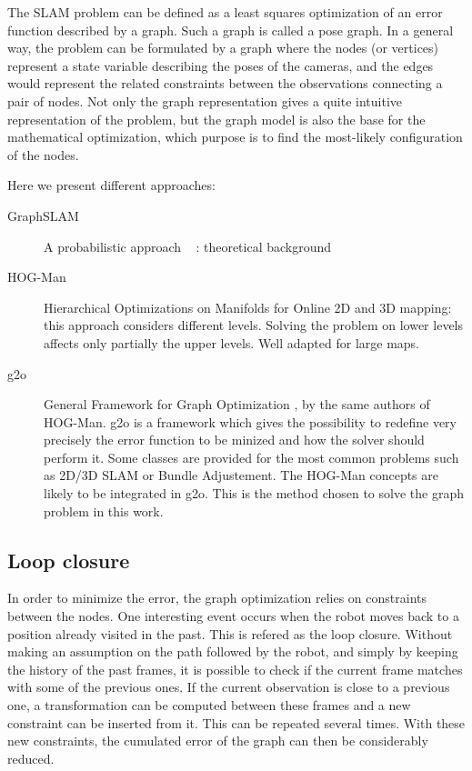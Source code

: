 The SLAM problem can be defined as a least squares optimization of an error function described by a graph. Such a graph is called a pose graph. In a general way, the problem can be formulated by a graph where the nodes (or vertices) represent a state variable describing the poses of the cameras, and the edges would represent the related constraints between the observations connecting a pair of nodes. Not only the graph representation gives a quite intuitive representation of the problem, but the graph model is also the base for the mathematical optimization, which purpose is to find the most-likely configuration of the nodes.

Here we present different approaches:
\begin{description}
\item[GraphSLAM] A probabilistic approach ~\cite{Thrun2005} : theoretical background
\item[HOG-Man] Hierarchical Optimizations on Manifolds for Online 2D and 3D mapping\cite{hogman2010}: this approach considers different levels. Solving the problem on lower levels affects only partially the upper levels. Well adapted for large maps.
\item[g2o] General Framework for Graph Optimization \cite{g2o2011}, by the same authors of HOG-Man\cite{hogman2010}. g2o is a framework which gives the possibility to redefine very precisely the error function to be minized and how the solver should perform it. Some classes are provided for the most common problems such as 2D/3D SLAM or Bundle Adjustement. The HOG-Man concepts are likely to be integrated in g2o. This is the method chosen to solve the graph problem in this work.
\end{description}

\subsection{Loop closure}
In order to minimize the error, the graph optimization relies on constraints between the nodes. One interesting event occurs when the robot moves back to a position already visited in the past. This is refered as the loop closure. Without making an assumption on the path followed by the robot, and simply by keeping the history of the past frames, it is possible to check if the current frame matches with some of the previous ones. If the current observation is close to a previous one, a transformation can be computed between these frames and a new constraint can be inserted from it. This can be repeated several times. With these new constraints, the cumulated error of the graph can then be considerably reduced. 

